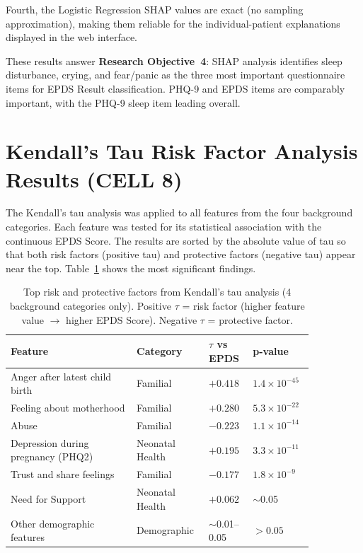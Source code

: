 Fourth, the Logistic Regression SHAP values are exact (no sampling approximation), making them reliable for the individual-patient explanations displayed in the web interface.

These results answer \textbf{Research Objective~4}: SHAP analysis identifies sleep disturbance, crying, and fear/panic as the three most important questionnaire items for EPDS Result classification. PHQ-9 and EPDS items are comparably important, with the PHQ-9 sleep item leading overall.

\section{Kendall's Tau Risk Factor Analysis Results (CELL 8)}
\label{ch4-sec-kendall}

The Kendall's tau analysis was applied to all features from the four background categories.
Each feature was tested for its statistical association with the continuous EPDS Score.
The results are sorted by the absolute value of tau so that both risk factors (positive tau) and protective factors (negative tau) appear near the top.
Table~\ref{ch4-tbl-kendall} shows the most significant findings.

\begin{table}[htbp]
\centering
\small
\caption{Top risk and protective factors from Kendall's tau analysis (4 background categories only). Positive $\tau$ = risk factor (higher feature value $\to$ higher EPDS Score). Negative $\tau$ = protective factor.}
\label{ch4-tbl-kendall}
\begin{tabular}{|>{\raggedright\arraybackslash}p{0.38\linewidth}|>{\raggedright\arraybackslash}p{0.18\linewidth}|>{\centering\arraybackslash}p{0.13\linewidth}|>{\centering\arraybackslash}p{0.16\linewidth}|}
\hline
\textbf{Feature} & \textbf{Category} & \textbf{$\tau$ vs EPDS} & \textbf{p-value} \\
\hline
Anger after latest child birth   & Familial       & $+0.418$ & $1.4 \times 10^{-45}$ \\
\hline
Feeling about motherhood         & Familial       & $+0.280$ & $5.3 \times 10^{-22}$ \\
\hline
Abuse                            & Familial       & $-0.223$ & $1.1 \times 10^{-14}$ \\
\hline
Depression during pregnancy (PHQ2) & Neonatal Health & $+0.195$ & $3.3 \times 10^{-11}$ \\
\hline
Trust and share feelings         & Familial       & $-0.177$ & $1.8 \times 10^{-9}$  \\
\hline
Need for Support                 & Neonatal Health & $+0.062$ & $\sim$0.05            \\
\hline
Other demographic features       & Demographic    & $\sim$0.01--0.05 & $> 0.05$ \\
\hline
\end{tabular}
\end{table}
\FloatBarrier

